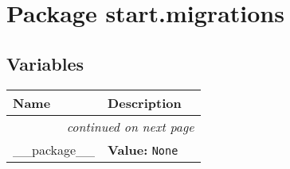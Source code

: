 %
%
%


\section{Package start.migrations}

    \label{start:migrations}


  \subsection{Variables}

    \vspace{-1cm}
\hspace{\varindent}\begin{longtable}{|p{\varnamewidth}|p{\vardescrwidth}|l}
\cline{1-2}
\cline{1-2} \centering \textbf{Name} & \centering \textbf{Description}& \\
\cline{1-2}
\endhead\cline{1-2}\multicolumn{3}{r}{\small\textit{continued on next page}}\\\endfoot\cline{1-2}
\endlastfoot\raggedright \_\-\_\-p\-a\-c\-k\-a\-g\-e\-\_\-\_\- & \raggedright \textbf{Value:} 
{\tt None}&\\
\cline{1-2}
\end{longtable}

